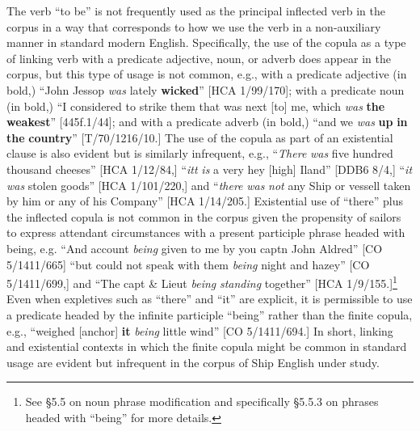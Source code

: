 The verb “to be” is not frequently used as the principal inflected verb in the corpus in a way that corresponds to how we use the verb in a non-auxiliary manner in standard modern English. Specifically, the use of the copula as a type of linking verb with a predicate adjective, noun, or adverb does appear in the corpus, but this type of usage is not common, e.g., with a predicate adjective (in bold,) “John Jessop \textit{was} lately \textbf{wicked}” [HCA 1/99/170]; with a predicate noun (in bold,) “I considered to strike them that was next [to] me, which \textit{was} \textbf{the} \textbf{weakest}” [445f.1/44]; and with a predicate adverb (in bold,) “and we \textit{was} \textbf{up} \textbf{in} \textbf{the} \textbf{country}” [T/70/1216/10.] The use of the copula as part of an existential clause is also evident but is similarly infrequent, e.g., “\textit{There} \textit{was} five hundred thousand cheeses” [HCA 1/12/84,] “\textit{itt} \textit{is} a very hey [high] Iland” [DDB6 8/4,] “\textit{it} \textit{was} stolen goods” [HCA 1/101/220,] and “\textit{there} \textit{was} \textit{not} any Ship or vessell taken by him or any of his Company” [HCA 1/14/205.] Existential use of “there” plus the inflected copula is not common in the corpus given the propensity of sailors to express attendant circumstances with a present participle phrase headed with being, e.g. “And account \textit{being} given to me by you captn John Aldred” [CO 5/1411/665] “but could not speak with them \textit{being} night and hazey” [CO 5/1411/699,] and “The capt \& Lieut \textit{being} \textit{standing} together” [HCA 1/9/155.]\footnote{See §5.5 on noun phrase modification and specifically §5.5.3 on phrases headed with “being” for more details.} Even when expletives such as “there” and “it” are explicit, it is permissible to use a predicate headed by the infinite participle “being” rather than the finite copula, e.g., “weighed [anchor] \textbf{it} \textit{being} little wind” [CO 5/1411/694.] In short, linking and existential contexts in which the finite copula might be common in standard usage are evident but infrequent in the corpus of Ship English under study. 

